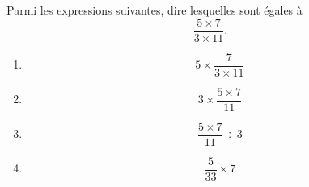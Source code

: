 
\begin{rituel}
    Parmi les expressions suivantes, dire lesquelles sont égales à
    \begin{equation}
        \frac{ 5\times 7 }{ 3\times 11 }.
    \end{equation}
    \begin{multicols}{2}
    \begin{enumerate}
        \item
            \begin{equation}
                5\times \frac{ 7 }{ 3\times 11 }
            \end{equation}
        \item
            \begin{equation}
                3\times \frac{ 5\times 7 }{ 11 }
            \end{equation}
        \item
            \begin{equation}
                \frac{ 5\times 7 }{ 11 }\div 3
            \end{equation}
        \item
            \begin{equation}
                \frac{ 5 }{ 33 }\times 7
            \end{equation}
    \end{enumerate}
    \end{multicols}
\end{rituel}

